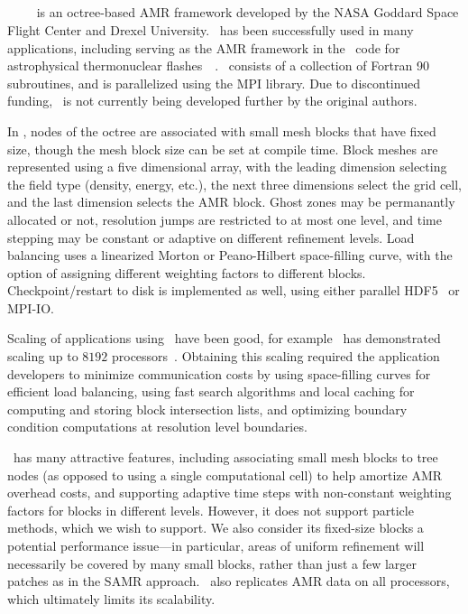 \documentclass[10pt,twocolumn]{article}
\begin{document}
\subsection{\paramesh} \label{ss:paramesh}

\paramesh~\cite{MaOl00}~\cite{OlMa05}~\cite{Ol06}~\cite{wwwparamesh}
is an octree-based AMR framework developed by the NASA Goddard Space
Flight Center and Drexel University.  \paramesh\ has been successfully
used in many applications, including serving as the AMR framework in
the \flash\ code for astrophysical thermonuclear
flashes~\cite{FrOl00}~\cite{wwwflash}.  \paramesh\ consists of a
collection of Fortran 90 subroutines, and is parallelized using the
MPI library.  Due to discontinued funding, \paramesh\ is not currently
being developed further by the original authors.

In \paramesh, nodes of the octree are associated with small mesh
blocks that have fixed size, though the mesh block size can be set at
compile time.  Block meshes are represented using a five dimensional
array, with the leading dimension selecting the field type (density,
energy, etc.), the next three dimensions select the grid cell, and the
last dimension selects the AMR block.  Ghost zones may be permanantly
allocated or not, resolution jumps are restricted to at most one
level, and time stepping may be constant or adaptive on different
refinement levels.  Load balancing uses a linearized Morton or
Peano-Hilbert space-filling curve, with the option of assigning
different weighting factors to different blocks.  Checkpoint/restart
to disk is implemented as well, using either parallel HDF5~\cite{hdf5}
or MPI-IO.

Scaling of applications using \paramesh\ have been good, for example
\flash\ has demonstrated scaling up to $8192$
processors~\cite{CoBe07}.  Obtaining this scaling required the
application developers to minimize communication costs by using
space-filling curves for efficient load balancing, using fast search
algorithms and local caching for computing and storing block
intersection lists, and optimizing boundary condition computations at
resolution level boundaries.

\paramesh\ has many attractive features, including associating small
mesh blocks to tree nodes (as opposed to using a single computational
cell) to help amortize AMR overhead costs, and supporting adaptive
time steps with non-constant weighting factors for blocks in different
levels.  However, it does not support particle methods, which we wish
to support.  We also consider its fixed-size blocks a potential
performance issue---in particular, areas of uniform refinement will
necessarily be covered by many small blocks, rather than just a few
larger patches as in the SAMR approach.  \paramesh\ also replicates
AMR data on all processors, which ultimately limits its scalability.
\end{document}
